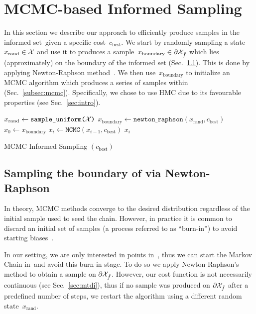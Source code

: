 \documentclass[letterpaper, 10 pt, conference]{ieeeconf}  %
\begin{document}
\section{MCMC-based Informed Sampling}
In this section we describe our approach to efficiently produce samples in the informed set~\Cinf given a specific cost~$c_{\text{best}}$.
We start  by randomly sampling a state~$x_\text{rand} \in \mathcal{X}$ and use it
to produces a sample~$x_\text{boundary} \in \partial\mathcal{X}_{\hat{f}}$ which lies (approximately) on the boundary of the informed set (Sec.~\ref{subsec:grad}).
This is done by applying Newton-Raphson method~\cite{RT06}.
We then use~$x_\text{boundary}$ to initialize an MCMC algorithm which produces a series of samples within \Cinf (Sec.~\ref{subsec:mcmc}). Specifically, we chose to use HMC due to its favourable properties (see Sec.~\ref{sec:intro}). 

\begin{algorithm}[t]
	\begin{algorithmic}[1]
		\STATE $x_{\text{rand}} \leftarrow \texttt{sample\_uniform(\ensuremath{\mathcal{X}})}$
		\STATE $x_{\text{boundary}} \leftarrow
		 \texttt{newton\_raphson}(x_{\text{rand}}, c_{\text{best}})$
		\STATE $x_{0} \leftarrow x_{\text{boundary}}$
			\STATE $x_{i} \leftarrow \texttt{MCMC} (x_{i-1}, c_{\text{best}})$
			\RETURN $x_{i}$
		\ENDFOR
		 
   	\end{algorithmic}
	\caption{MCMC Informed Sampling $(c_{\text{best}})$}
	\label{alg:mcmc_informed_sampling}	
\end{algorithm}


\subsection{Sampling the boundary of \Cinf via Newton-Raphson}
\label{subsec:grad}
In theory, MCMC methods converge to the desired distribution regardless of the initial sample used to seed the chain.
However, in practice it is common to discard an initial set of samples (a process referred to as ``burn-in'') to avoid starting biases~\cite{ADDJ03}. 

In our setting, we are only interested in points in~\Cinf, thus we can start the Markov Chain in~\Cinf and avoid this burn-in stage. 
To do so we apply  Newton-Raphson's method to obtain a sample on $\partial \mathcal{X}_{\hat{f}}$. 
However, our cost function is not necessarily continuous (see Sec.~\ref{sec:mtdi}), thus if no sample was produced on $\partial \mathcal{X}_{\hat{f}}$ after a predefined number of steps, we restart the algorithm using a different random state~$x_\text{rand}$.
\end{document}
